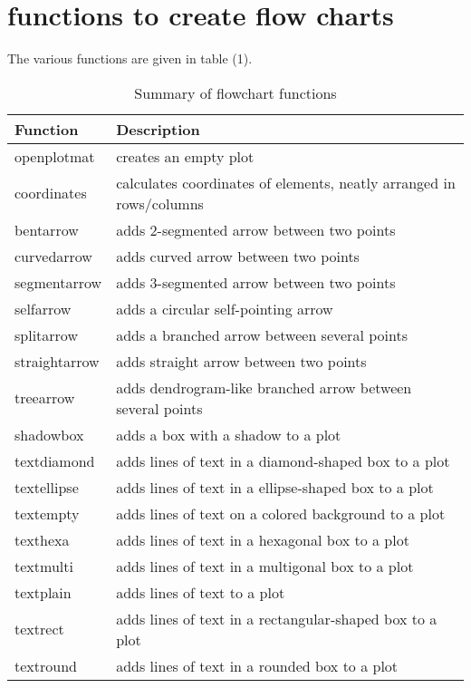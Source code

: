 \documentclass[article,nojss]{jss}
\begin{document}
\section{functions to create flow charts}

The various functions are given in table (1).
\begin{table*}[t]
\caption{Summary of flowchart functions}\label{tb:arr}
\centering
\begin{tabular}{p{}p{}}\\
 Function & Description\\
\hline
openplotmat   &  creates an empty plot\\
coordinates   &  calculates coordinates of elements, neatly arranged in rows/columns\\
bentarrow     &  adds 2-segmented arrow between two points\\
curvedarrow   &  adds curved arrow between two points\\
segmentarrow  &  adds 3-segmented arrow between two points\\
selfarrow     &  adds a circular self-pointing arrow \\
splitarrow    &  adds a branched arrow between several points\\
straightarrow &  adds straight arrow between two points\\
treearrow     &  adds dendrogram-like branched arrow between several points\\
shadowbox     &  adds a box with a shadow to a plot\\
textdiamond   &  adds lines of text in a diamond-shaped box to a plot\\
textellipse   &  adds lines of text in a ellipse-shaped box to a plot\\
textempty     &  adds lines of text on a colored background to a plot\\
texthexa      &  adds lines of text in a hexagonal box to a plot\\
textmulti     &  adds lines of text in a multigonal box to a plot\\
textplain     &  adds lines of text to a plot\\
textrect      &  adds lines of text in a rectangular-shaped box to a plot\\
textround     &  adds lines of text in a rounded box to a plot\\
\hline
\end{tabular}
\end{table*}
\end{document}
